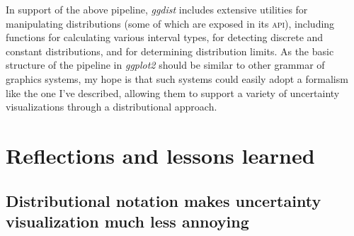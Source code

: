 \documentclass[journal]{vgtc}                     %
\begin{document}
In support of the above pipeline, \textit{ggdist} includes extensive utilities for manipulating distributions (some of which are exposed in its \textsc{api}), including functions for calculating various interval types, for detecting discrete and constant distributions, and for determining distribution limits. As the basic structure of the pipeline in \textit{ggplot2} should be similar to other grammar of graphics systems, my hope is that such systems could easily adopt a formalism like the one I've described, allowing them to support a variety of uncertainty visualizations through a distributional approach.









\section{Reflections and lessons learned}


\subsection{Distributional notation makes uncertainty\\visualization much less annoying}

\end{document}
